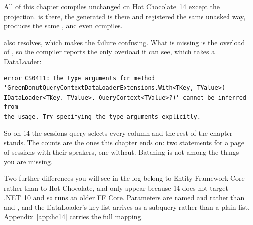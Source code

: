 \begin{onhc14}
All of this chapter compiles unchanged on Hot Chocolate~14 except the
projection. \code{[DataLoader]} is there, the generated
 is there and registered the same unasked way,
\code{[UsePaging]} produces the same , and even
 compiles.

 also resolves, which makes the failure confusing.
What is missing is the  overload of , so the
compiler reports the only overload it can see, which takes a DataLoader:

\begin{verbatim}
error CS0411: The type arguments for method
'GreenDonutQueryContextDataLoaderExtensions.With<TKey, TValue>(
IDataLoader<TKey, TValue>, QueryContext<TValue>?)' cannot be inferred from
the usage. Try specifying the type arguments explicitly.
\end{verbatim}

So on 14 the sessions query selects every column and the rest of the chapter
stands. The counts are the ones this chapter ends on: two statements for a page
of sessions with their speakers, one without. Batching is not among the things
you are missing.

Two further differences you will see in the log belong to Entity Framework
Core rather than to Hot Chocolate, and only appear because 14 does not target
.NET~10 and so runs an older EF Core. Parameters are named 
and  rather than  and , and the
DataLoader's key list arrives as a  subquery rather than a
plain  list. Appendix~\ref{app:hc14} carries the full mapping.
\end{onhc14}
